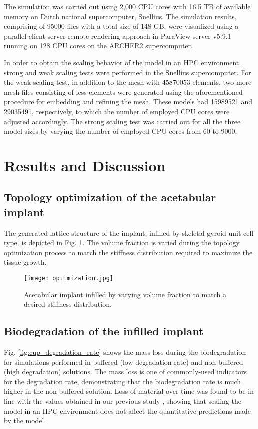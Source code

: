 The simulation was carried out using 2,000 CPU cores with 16.5 TB of available memory on Dutch national supercomputer, Snellius. The simulation results, comprising of \num{95000} files with a total size of 148 GB, were visualized using a parallel client-server remote rendering approach in ParaView server v5.9.1 running on 128 CPU cores on the ARCHER2 supercomputer. 

In order to obtain the scaling behavior of the model in an HPC environment, strong and weak scaling tests were performed in the Snellius supercomputer. For the weak scaling test, in addition to the mesh with \num{45870053} elements, two more mesh files consisting of less elements were generated using the aforementioned procedure for embedding and refining the mesh. These models had \num{15989521} and \num{29035491}, respectively, to which the number of employed CPU cores were adjusted accordingly. The strong scaling test was carried out for all the three model sizes by varying the number of employed CPU cores from 60 to \num{9000}. 


\section{Results and Discussion}

\subsection{Topology optimization of the acetabular implant}

The generated lattice structure of the implant, infilled by skeletal-gyroid unit cell type, is depicted in Fig. \ref{fig:cup_optimization}. The volume fraction is varied during the topology optimization process to match the stiffness distribution required to maximize the tissue growth. 

\begin{figure}[h]
\centering
\medskip
\texttt{[image: optimization.jpg]}
\caption[Infilled acetabular implant]{Acetabular implant infilled by varying volume fraction to match a desired stiffness distribution.} \label{fig:cup_optimization}
\end{figure}

\subsection{Biodegradation of the infilled implant}

Fig. \ref{fig:cup_degradation_rate} shows the mass loss during the biodegradation for simulations performed in buffered (low degradation rate) and non-buffered (high degradation) solutions. The mass loss is one of commonly-used indicators for the degradation rate, demonstrating that the biodegradation rate is much higher in the non-buffered solution. Loss of material over time was found to be in line with the values obtained in our previous study \cite{Barzegari2021}, showing that scaling the model in an HPC environment does not affect the quantitative predictions made by the model.

